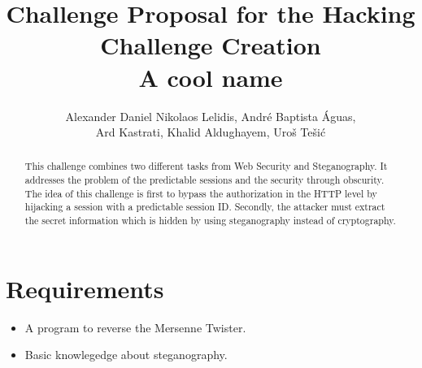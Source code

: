 \documentclass[11pt]{article}
\title{\vspace{-1.7cm}Challenge Proposal for the Hacking Challenge Creation
\\[0.3in]
\bfseries A cool name
\\[0.1in]
}
\author{Alexander Daniel Nikolaos Lelidis, Andr\'{e} Baptista \'{A}guas, \\ Ard Kastrati, Khalid Aldughayem, Uro\v{s} Te\v{s}i\'{c}}
\begin{document}
\maketitle

\begin{abstract}
This challenge combines two different tasks from Web Security and Steganography. It addresses the problem of the predictable sessions and the security through obscurity. The idea of this challenge is first to bypass the authorization in the HTTP level by hijacking a session with a predictable session ID. Secondly, the attacker must extract the secret information which is hidden by using steganography instead of cryptography. 
\end{abstract}


\section{Requirements}
\begin{itemize}
\item A program to reverse the Mersenne Twister.
\item Basic knowlegedge about steganography.
\end{itemize}
\end{document}
